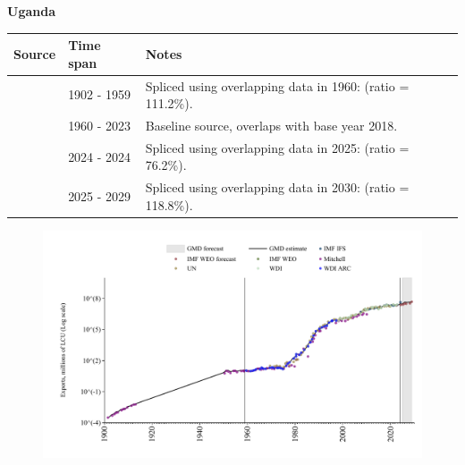 \documentclass[12pt,a4paper,landscape]{article}
\begin{document}
\begin{adjustbox}{max totalsize={\paperwidth}{\paperheight},center}
\begin{minipage}[t][\textheight][t]{\textwidth}
\vspace*{0.5cm}
{}
\begin{center}
{\Large\bfseries Uganda}
\end{center}
\vspace{0.5cm}
\begin{table}[H]
\centering
\small
\begin{tabular}{|l|l|l|}
\hline
\textbf{Source} & \textbf{Time span} & \textbf{Notes} \\
\hline
\rowcolor{white}\cite{Mitchell}& 1902 - 1959 &Spliced using overlapping data in 1960: (ratio = 111.2\%).\\
\rowcolor{lightgray}\cite{WDI}& 1960 - 2023 &Baseline source, overlaps with base year 2018.\\
\rowcolor{white}\cite{IMF_IFS}& 2024 - 2024 &Spliced using overlapping data in 2025: (ratio = 76.2\%).\\
\rowcolor{lightgray}\cite{IMF_WEO_forecast}& 2025 - 2029 &Spliced using overlapping data in 2030: (ratio = 118.8\%).\\
\hline
\end{tabular}
\end{table}
\begin{figure}[H]
\centering
\includegraphics[width=\textwidth,height=0.6\textheight,keepaspectratio]{graphs/UGA_exports.pdf}
\end{figure}
\end{minipage}
\end{adjustbox}
\end{document}
